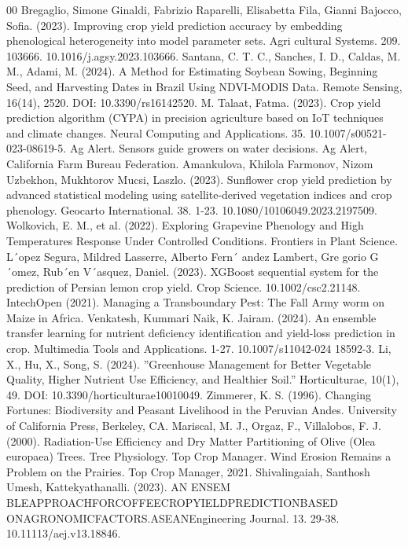 \documentclass[conference]{IEEEtran}
\begin{document}
\begin{thebibliography}{00}
 Bregaglio, Simone Ginaldi, Fabrizio Raparelli, Elisabetta Fila, Gianni Bajocco, Sofia. (2023). Improving crop yield prediction accuracy by embedding phenological heterogeneity into model parameter sets. Agri cultural Systems. 209. 103666. 10.1016/j.agsy.2023.103666.
 Santana, C. T. C., Sanches, I. D., Caldas, M. M., Adami, M. (2024). A Method for Estimating Soybean Sowing, Beginning Seed, and Harvesting Dates in Brazil Using NDVI-MODIS Data. Remote Sensing, 16(14), 2520. DOI: 10.3390/rs16142520.
  M. Talaat, Fatma. (2023). Crop yield prediction algorithm (CYPA) in precision agriculture based on IoT techniques and climate changes. Neural Computing and Applications. 35. 10.1007/s00521-023-08619-5.
 Ag Alert. Sensors guide growers on water decisions. Ag Alert, California Farm Bureau Federation. 
 Amankulova, Khilola Farmonov, Nizom Uzbekhon, Mukhtorov Mucsi, Laszlo. (2023). Sunflower crop yield prediction by advanced statistical modeling using satellite-derived vegetation indices and crop phenology. Geocarto International. 38. 1-23. 10.1080/10106049.2023.2197509. 
 Wolkovich, E. M., et al. (2022). Exploring Grapevine Phenology and High Temperatures Response Under Controlled Conditions. Frontiers in Plant Science. 
 L´opez Segura, Mildred Lasserre, Alberto Fern´ andez Lambert, Gre gorio G´omez, Rub´en V´asquez, Daniel. (2023). XGBoost sequential system for the prediction of Persian lemon crop yield. Crop Science. 10.1002/csc2.21148. 
 IntechOpen (2021). Managing a Transboundary Pest: The Fall Army worm on Maize in Africa. 
 Venkatesh, Kummari Naik, K. Jairam. (2024). An ensemble transfer learning for nutrient deficiency identification and yield-loss prediction in crop. Multimedia Tools and Applications. 1-27. 10.1007/s11042-024 18592-3.  
 Li, X., Hu, X., Song, S. (2024). ”Greenhouse Management for Better Vegetable Quality, Higher Nutrient Use Efficiency, and Healthier Soil.” Horticulturae, 10(1), 49. DOI: 10.3390/horticulturae10010049. 
 Zimmerer, K. S. (1996). Changing Fortunes: Biodiversity and Peasant Livelihood in the Peruvian Andes. University of California Press, Berkeley, CA. 
 Mariscal, M. J., Orgaz, F., Villalobos, F. J. (2000). Radiation-Use Efficiency and Dry Matter Partitioning of Olive (Olea europaea) Trees. Tree Physiology. 
 Top Crop Manager. Wind Erosion Remains a Problem on the Prairies. Top Crop Manager, 2021.  
 Shivalingaiah, Santhosh Umesh, Kattekyathanalli. (2023). AN ENSEM BLEAPPROACHFORCOFFEECROPYIELDPREDICTIONBASED ONAGRONOMICFACTORS.ASEANEngineering Journal. 13. 29-38. 10.11113/aej.v13.18846. 

\end{thebibliography}
\end{document}
